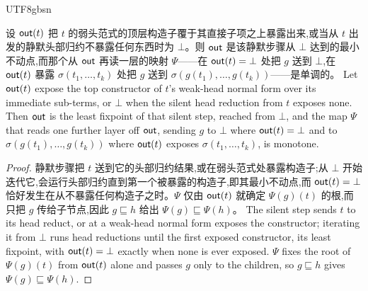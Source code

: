 \begin{CJK*}{UTF8}{gbsn}
  \begin{lemma}\label{lem:mono-llt}
    \ifTablambdaChinese
    设 $\mathsf{out}(t)$ 把 $t$ 的弱头范式的顶层构造子覆于其直接子项之上暴露出来,或当从 $t$ 出发的静默头部归约不暴露任何东西时为 $\bot$。则 $\mathsf{out}$ 是该静默步骤从 $\bot$ 达到的最小不动点,而那个从 $\mathsf{out}$ 再读一层的映射 $\Psi$——在 $\mathsf{out}(t) = \bot$ 处把 $g$ 送到 $\bot$,在 $\mathsf{out}(t)$ 暴露 $\sigma(t_1, \dots, t_k)$ 处把 $g$ 送到 $\sigma(g(t_1), \dots, g(t_k))$——是单调的。
    \else
    Let $\mathsf{out}(t)$ expose the top constructor of $t$'s weak-head normal form over its immediate sub-terms, or $\bot$ when the silent head reduction from $t$ exposes none. Then $\mathsf{out}$ is the least fixpoint of that silent step, reached from $\bot$, and the map $\Psi$ that reads one further layer off $\mathsf{out}$, sending $g$ to $\bot$ where $\mathsf{out}(t) = \bot$ and to $\sigma(g(t_1), \dots, g(t_k))$ where $\mathsf{out}(t)$ exposes $\sigma(t_1, \dots, t_k)$, is monotone.
    \fi
  \end{lemma}
  \begin{proof}
    \ifTablambdaChinese
    静默步骤把 $t$ 送到它的头部归约结果,或在弱头范式处暴露构造子;从 $\bot$ 开始迭代它,会运行头部归约直到第一个被暴露的构造子,即其最小不动点,而 $\mathsf{out}(t) = \bot$ 恰好发生在从不暴露任何构造子之时。$\Psi$ 仅由 $\mathsf{out}(t)$ 就确定 $\Psi(g)(t)$ 的根,而只把 $g$ 传给子节点,因此 $g \sqsubseteq h$ 给出 $\Psi(g) \sqsubseteq \Psi(h)$。
    \else
    The silent step sends $t$ to its head reduct, or at a weak-head normal form exposes the constructor; iterating it from $\bot$ runs head reductions until the first exposed constructor, its least fixpoint, with $\mathsf{out}(t) = \bot$ exactly when none is ever exposed. $\Psi$ fixes the root of $\Psi(g)(t)$ from $\mathsf{out}(t)$ alone and passes $g$ only to the children, so $g \sqsubseteq h$ gives $\Psi(g) \sqsubseteq \Psi(h)$.
    \fi
  \end{proof}


\end{CJK*}
